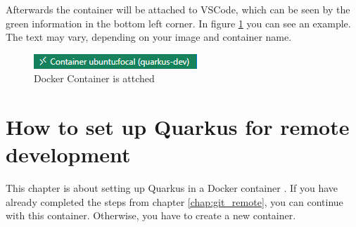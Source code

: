         Afterwards the container will be attached to VSCode, which can be seen by the green information in the bottom left corner. In figure \ref{fig:container_attached} you can see an example. The text may vary, depending on your image and container name.     
        
        \begin{figure}[h]
            \centering
            \includegraphics{images/container_attached.png}
            \caption{Docker Container is attched}
            \label{fig:container_attached}
        \end{figure}
    


\chapter{How to set up Quarkus for remote development}
    This chapter is about setting up Quarkus in a Docker container \autocite[vgl.][]{quarkus}. If you have already completed the steps from chapter \ref{chap:git_remote}, you can continue with this container. Otherwise, you have to create a new container.


